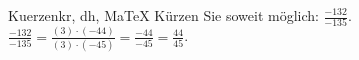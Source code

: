 \begin{MAufgabe}{Kuerzen}{kr, dh, MaTeX}
K\"urzen Sie soweit m\"oglich: $\frac{-132}{-135}$.\\ 
\ifLsg\MLoesung
\quad $\frac{-132}{-135}=\frac{(3)\cdot(-44)}{(3)\cdot(-45)}=\frac{-44}{-45}=\frac{44}{45}$.\else\relax\fi
 \end{MAufgabe}